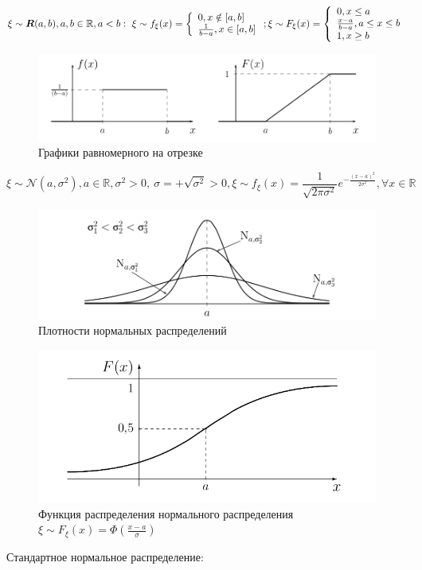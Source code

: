 \begin{defs}
	\begin{itemize*}
		\item {}

		\begin{gather*}
			\xi \sim \boldsymbol{R}(a,b), a,b \in \mathbb{R}, a < b: \ \xi \sim f_{\xi}(x) = \left\{\begin{array}{l} 0 , x \notin [a,b] \\ \frac{1}{b-a}, x \in [a,b] \end{array}\right.; \xi \sim F_{\xi}(x) = \left\{\begin{array}{l} 	0 , x \leq a \\ \frac{x-a}{b-a}, a \leq x \leq b \\ 1 , x \geq b \end{array}\right.
		\end{gather*}
		\begin{figure}[H]
		      \centering
		      \includegraphics[width=0.8\linewidth]{img/ravnom1.png}
		      \caption{Графики равномерного на отрезке}
		\end{figure}
		\item {}

		$$\xi \sim \mathcal{N}(a,\sigma^{2}), a \in \mathbb{R}, \sigma^{2} > 0, \ \sigma = +\sqrt{\sigma^{2}} > 0, \xi \sim f_{\xi}(x) = \frac{1}{\sqrt{2\pi\sigma^{2}}}e^{-\frac{(x-a)^{2}}{2\sigma^{2}}}, \forall x \in \mathbb{R}$$

		\begin{figure}[H]
		      \centering
		      \includegraphics[width=0.8\linewidth]{img/plotnorm.png}
		      \caption{Плотности нормальных распределений}
		\end{figure}

		\begin{figure}[H]
		      \centering
		      \includegraphics[width=0.8\linewidth]{img/frnorm.png}
		      \caption{Функция распределения нормального распределения $\xi \sim F_{\xi}(x) = \Phi \left( \frac{x-a}{\sigma} \right)$}
		\end{figure}
		Стандартное нормальное распределение:


\end{itemize*}
\end{defs}
